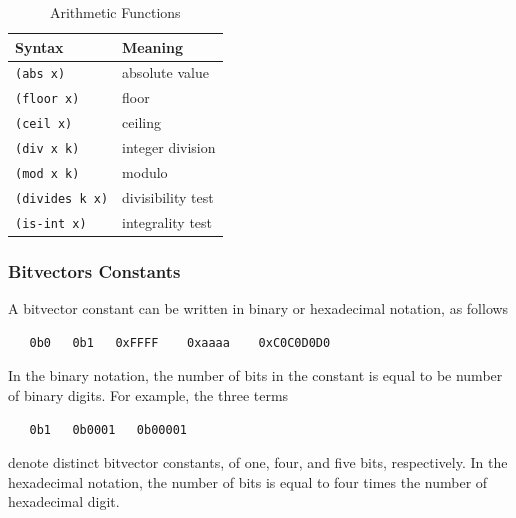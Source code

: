 \documentclass[11pt,twoside,fleqn,openright,titlepage]{cslreport}
\begin{document}
\begin{table}[h]
\begin{small}
\begin{center}
\begin{tabular}{|p{3.4cm}|l|}
\hline Syntax & Meaning \\
\hline
\texttt{(abs x)} & absolute value \\
\texttt{(floor x)} & floor \\
\texttt{(ceil x)} & ceiling \\
\hline
\texttt{(div x k)} & integer division \\
\texttt{(mod x k)} & modulo \\
\texttt{(divides k x)} & divisibility test\\
\texttt{(is-int x)} & integrality test\\
\hline
\end{tabular}
\end{center}
\end{small}
\caption{Arithmetic Functions}
\label{Arithmetic-Functions}
\end{table}

\subsubsection*{Bitvectors Constants}

A bitvector constant can be written in binary or hexadecimal notation, as follows
\begin{small}
\begin{verbatim}
   0b0   0b1   0xFFFF    0xaaaa    0xC0C0D0D0
\end{verbatim}
\end{small}
In the binary notation, the number of bits in the constant is equal to
be number of binary digits. For example, the three terms
\begin{small}
\begin{verbatim}
   0b1   0b0001   0b00001
\end{verbatim}
\end{small}
denote distinct bitvector constants, of one, four, and five bits, respectively.
In the hexadecimal notation, the number of bits is equal to four times the number
of hexadecimal digit.
\end{document}
